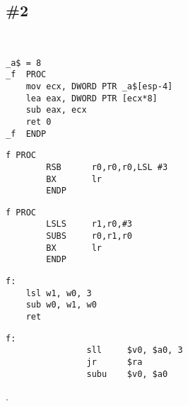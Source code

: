 \section{\Exercises}


\subsection{\Exercise \#2}
\label{exercise_arith_optimizations_2}

\WhatThisCodeDoes\

\begin{lstlisting}[caption=\Optimizing MSVC 2010]
_a$ = 8
_f	PROC
	mov	ecx, DWORD PTR _a$[esp-4]
	lea	eax, DWORD PTR [ecx*8]
	sub	eax, ecx
	ret	0
_f	ENDP
\end{lstlisting}

\begin{lstlisting}[caption=\NonOptimizingKeilVI (\ARMMode)]
f PROC
        RSB      r0,r0,r0,LSL #3
        BX       lr
        ENDP
\end{lstlisting}

\begin{lstlisting}[caption=\NonOptimizingKeilVI (\ThumbMode)]
f PROC
        LSLS     r1,r0,#3
        SUBS     r0,r1,r0
        BX       lr
        ENDP
\end{lstlisting}

\begin{lstlisting}[caption=\Optimizing GCC 4.9 (ARM64)]
f:
	lsl	w1, w0, 3
	sub	w0, w1, w0
	ret
\end{lstlisting}

\begin{lstlisting}[caption=\Optimizing GCC 4.4.5 (MIPS) (IDA)]
f:
                sll     $v0, $a0, 3
                jr      $ra
                subu    $v0, $a0
\end{lstlisting}

\Answer\: .
